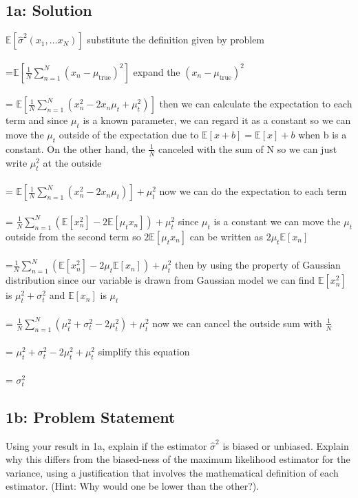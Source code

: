 \documentclass[10pt]{article}
\newcommand{\officialdirections}[1]{{\color{purple} #1}}
\begin{document}
\subsection{1a: Solution}
$\mathbb{E}[\hat{\sigma}^2(x_1, \ldots x_N)]$ substitute the definition given by problem
\\
\\
=$\mathbb{E}[\frac{1}{N}\sum_{n=1}^N (x_n - \mu_{\text{true}})^2]$ expand the $(x_n - \mu_{\text{true}})^2$
\\
\\
= $\mathbb{E}[\frac{1}{N}\sum_{n=1}^N(x_n^2-2x_{n}\mu_t+\mu_t^2)]$ then we can calculate the expectation to each term and since $\mu_t$ is a known parameter, we can regard it as a constant so we can move the $\mu_t$ outside of the expectation due to $\mathbb{E}[x+b] = \mathbb{E}[x]+b$ when b is a constant. On the other hand, the $\frac{1}{N}$ canceled with the sum of N so we can just write $\mu_t^2$ at the outside
\\
\\
= $\mathbb{E}[\frac{1}{N}\sum_{n=1}^N(x_n^2-2x_{n}\mu_t)] + \mu_t^2$ now we can do the expectation to each term
\\
\\
= $\frac{1}{N}\sum_{n=1}^N(\mathbb{E}[x_n^2]-2\mathbb{E}[\mu_tx_n])+\mu_t^2$ since $\mu_t$ is a constant we can move the $\mu_t$ outside from the second term so $2\mathbb{E}[\mu_tx_n]$ can be written as $2\mu_t\mathbb{E}[x_n]$
\\
\\
=$\frac{1}{N}\sum_{n=1}^N(\mathbb{E}[x_n^2]-2\mu_t\mathbb{E}[x_n])+\mu_t^2$ then by using the property of Gaussian distribution since our variable is drawn from Gaussian model we can find $\mathbb{E}[x_n^2]$ is $\mu_t^2 + \sigma_t^2$ and $\mathbb{E}[x_n]$ is $\mu_t$
\\
\\
= $\frac{1}{N}\sum_{n=1}^N(\mu_t^2 + \sigma_t^2 - 2\mu_t^2)+\mu_t^2$ now we can cancel the outside sum with $\frac{1}{N}$
\\
\\
= $\mu_t^2 + \sigma_t^2 - 2\mu_t^2+\mu_t^2$ simplify this equation
\\
\\
= $\sigma_t^2$

\officialdirections{
\subsection*{1b: Problem Statement}
Using your result in 1a, explain if the estimator $\hat{\sigma}^2$ is biased or unbiased. Explain why this differs from the biased-ness of the maximum likelihood estimator for the variance, using a justification that involves the mathematical definition of each estimator. (Hint: Why would one be lower than the other?).
}
\end{document}
